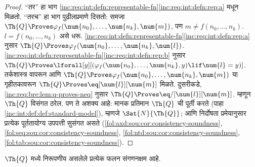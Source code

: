 \begin{proof}
  ``तर'' हा भाग
\ref{inc:req:int:defn:representable-fn}\ref{inc:req:int:defn:rep:a} मधून मिळतो.
``तरच'' हा भाग पुढीलप्रमाणे दिसतो: समजा $\Th{Q} \Proves \varphi_f(\num{n_0},
\dots, \num{n_k}, \num{m})$, पण $m \neq f(n_0, \dots, n_k)$.
$l = f(n_0, \dots, n_k)$ असे धरू.
\ref{inc:req:int:defn:representable-fn}\ref{inc:req:int:defn:rep:a} नुसार $\Th{Q}
\Proves \varphi_f(\num{n_0}, \dots, \num{n_k}, \num{l})$.
\ref{inc:req:int:defn:representable-fn}\ref{inc:req:int:defn:rep:b} नुसार
$\Th{Q} \Proves \lforall[y][(\varphi_f(\num{n_0}, \dots, \num{n_k}, y) \lif \num{l} =
y)]$. तर्कशास्त्र वापरून आणि $\Th{Q} \Proves
\varphi_f(\num{n_0}, \dots, \num{n_k}, \num{m})$ या गृहीतकावरून
$\Th{Q} \Proves \eq[\num{l}][\num{m}]$ मिळते. दुसरीकडे,
\ref{inc:req:bre:lem:q-proves-neq} नुसार $\Th{Q} \Proves
\eq/[\num{l}][\num{m}]$. म्हणून $\Th{Q}$ विसंगत ठरेल.
पण ते अशक्य आहे: मानक प्रतिमान $\Th{Q}$ ची पूर्ती करते
(पाहा \ref{inc:int:def:def:standard-model}), म्हणजे
$\Sat{N}{\Th{Q}}$; आणि निर्दोषता प्रमेयानुसार प्रत्येक
पूर्ततायोग्य उपपत्ती सुसंगत असते
(\ref{fol:axd:sou:cor:consistency-soundness}, \ref{fol:seq:sou:cor:consistency-soundness}, \ref{fol:ntd:sou:cor:consistency-soundness}, \ref{fol:tab:sou:cor:consistency-soundness}).
\end{proof}

\begin{lem}
$\Th{Q}$ मध्ये निरूपणीय असलेले प्रत्येक फलन संगणनक्षम आहे.
\end{lem}

